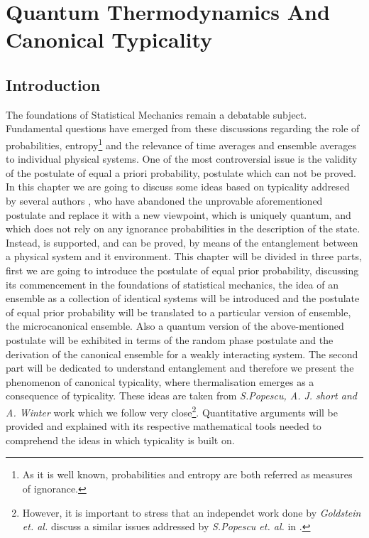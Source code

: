 \chapter{Quantum Thermodynamics And Canonical Typicality}
\section{Introduction}

The foundations of Statistical Mechanics remain a debatable subject. Fundamental questions have emerged from these discussions regarding the role of probabilities, entropy\footnote{As it is well known, probabilities and entropy are both referred as measures of ignorance.} and the relevance of time averages and ensemble averages to individual physical systems. One of the most controversial issue is the validity of the postulate of equal a priori probability, postulate which can not be proved. \\
In this chapter we are going to discuss some ideas based on typicality addresed by several authors \cite{gemmer_quantum_2004, goldstein_canonical_2006, popescu_entanglement_2006}, who have abandoned the unprovable aforementioned postulate and replace it with a new viewpoint, which is uniquely quantum, and which does not rely on any ignorance probabilities in the description of the state. Instead, is supported, and can be proved, by means of the entanglement between a physical system and it environment. 
\newline
This chapter will be divided in three parts, first we are going to introduce the postulate of equal prior probability, discussing its commencement in the foundations of statistical mechanics, the idea of an ensemble as a collection of identical systems will be introduced and the postulate of equal prior probability will be translated  to a particular version of ensemble, the microcanonical ensemble. Also a quantum version of the above-mentioned postulate will be exhibited in terms of the random phase postulate \cite{landau_statistical_2013} and the derivation of the canonical ensemble for a weakly interacting system.
\newline
The second part will be dedicated to understand entanglement and therefore we present the phenomenon of canonical typicality, where thermalisation emerges as a consequence of typicality. These ideas are taken from  \textit{S.Popescu, A. J. short and A. Winter} \cite{popescu_entanglement_2006, popescu_foundations_2005} work which we follow very close\footnote{However, it is important to stress that an independet work done by \textit{Goldstein et. al.} \cite{goldstein_canonical_2006} discuss a similar issues addressed by  \textit{S.Popescu et. al.} in \cite{popescu_entanglement_2006, popescu_foundations_2005}.}. Quantitative arguments will be provided and explained with its respective mathematical tools needed to comprehend the ideas in which typicality is built on.
